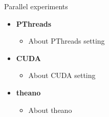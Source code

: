 \begin{frame}{Parallel experiments}
	\begin{itemize}
	\item { \textbf{PThreads} }
		\begin{itemize}
		\item {About PThreads setting}
		\end{itemize}
	\item { \textbf{CUDA} }
		\begin{itemize}
		\item {About CUDA setting}
		\end{itemize}
	\item { \textbf{theano} }
		\begin{itemize}
		\item {About theano}
		\end{itemize}
	\end{itemize}

\end{frame}